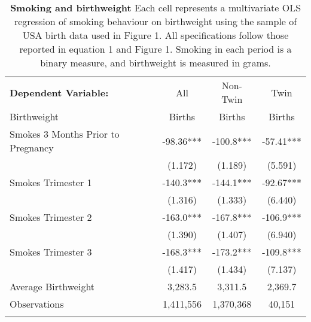 \documentclass[12pt]{article}
\begin{document}
\begin{spacing}{1}
  \clearpage

  \thispagestyle{empty}

\addtocounter{table}{-1}

\clearpage
\begin{table}
  \begin{center}
    \begin{tabular}{lccc}
      \toprule
      \textbf{Dependent Variable:}      & All & Non-Twin & Twin \\
      Birthweight      & Births & Births & Births \\
      \midrule
      Smokes 3 Months Prior to Pregnancy & -98.36*** & -100.8*** & -57.41*** \\
      & (1.172) & (1.189) &  (5.591) \\
      Smokes Trimester 1 & -140.3*** & -144.1*** & -92.67*** \\
      & (1.316) & (1.333) & (6.440) \\
      Smokes Trimester 2 & -163.0*** & -167.8*** & -106.9*** \\
      & (1.390) & (1.407) & (6.940) \\
      Smokes Trimester 3 & -168.3*** & -173.2*** & -109.8*** \\
      & (1.417) & (1.434) & (7.137) \\
      \midrule
      Average Birthweight & 3,283.5   & 3,311.5   & 2,369.7 \\
      Observations        & 1,411,556 & 1,370,368 & 40,151  \\
      \bottomrule
      \caption{\textbf{Smoking and birthweight} {\footnotesize Each cell represents a multivariate OLS regression of smoking behaviour on birthweight using the sample of USA birth data used in Figure 1.  All specifications follow those reported in equation 1 and Figure 1.  Smoking in each period is a binary measure, and birthweight is measured in grams.}}
    \end{tabular}
  \end{center}
\end{table}



\end{spacing}
\end{document}
